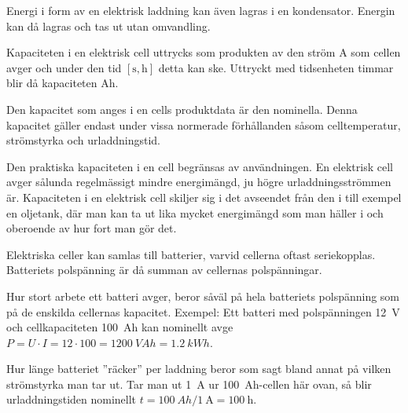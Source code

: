 Energi i form av en elektrisk laddning kan även lagras i en kondensator.
Energin kan då lagras och tas ut utan omvandling.

Kapaciteten i en elektrisk cell uttrycks som produkten av den ström \unit{\ampere}
som cellen avger och under den tid \(\mathrm{[s, h]}\) detta kan ske.
Uttryckt med tidsenheten timmar blir då kapaciteten \unit{Ah}.

Den kapacitet som anges i en cells produktdata är den nominella.
Denna kapacitet gäller endast under vissa normerade förhållanden såsom
celltemperatur, strömstyrka och urladdningstid.

Den praktiska kapaciteten i en cell begränsas av användningen.
En elektrisk cell avger sålunda regelmässigt mindre energimängd, ju högre
urladdningsströmmen är.
Kapaciteten i en elektrisk cell skiljer sig i det avseendet från den i till
exempel en oljetank, där man kan ta ut lika mycket energimängd som man häller i
och oberoende av hur fort man gör det.

Elektriska celler kan samlas till batterier, varvid cellerna oftast
seriekopplas.
Batteriets polspänning är då summan av cellernas pols\-pänningar.

Hur stort arbete ett batteri avger, beror såväl på hela batteriets
polspänning som på de enskilda cellernas kapacitet.
Exempel:
Ett batteri med polspänningen \qty{12}{\volt} och cellkapaciteten
\qty{100}{Ah} kan nominellt avge
\(P = U \cdot I = 12 \cdot 100 = \qty{1200}{VAh} = \qty{1,2}{kWh}\).

Hur länge batteriet ''räcker'' per laddning beror som sagt bland annat på
vilken strömstyrka man tar ut.
Tar man ut \qty{1}{\ampere} ur \qty{100}{Ah}-cellen här ovan, så blir
urladdningstiden nominellt \(t = \qty{100}{Ah}/\qty{1}{\ampere} =
\qty{100}{\hour}\).
